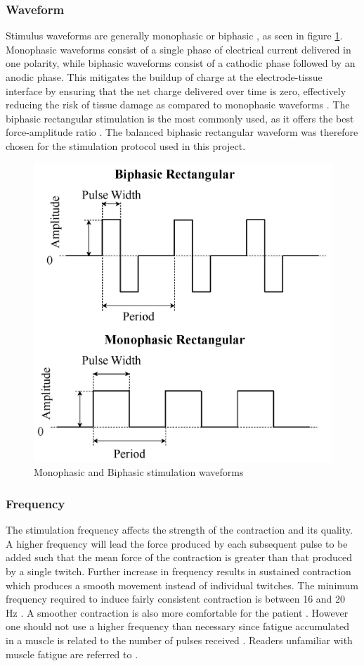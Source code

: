 \subsubsection{Waveform}
Stimulus waveforms are generally monophasic or biphasic \cite{lynch_functional_2008}, as seen in figure \ref{fig:twowave}. Monophasic waveforms consist of a single phase of electrical current delivered in one polarity, while biphasic waveforms consist of a cathodic phase followed by an anodic phase. This mitigates the buildup of charge at the electrode-tissue interface by ensuring that the net charge delivered over time is zero, effectively reducing the risk of tissue damage as compared to monophasic waveforms \cite{peckham_functional_2005}. The biphasic rectangular stimulation is the most commonly used, as it offers the best force-amplitude ratio \cite{lynch_functional_2008}. The balanced biphasic rectangular waveform was therefore chosen for the stimulation protocol used in this project.
 \begin{figure} [H]
     \centering
     \includegraphics[width=0.6\linewidth]{images/twowaveform.jpg}
     \caption{Monophasic and Biphasic stimulation waveforms \cite{vrontos_electrical_2024}}
     \label{fig:twowave}
 \end{figure}

 \subsubsection{Frequency}
 The stimulation frequency affects the strength of the contraction and its quality. A higher frequency will lead the force produced by each subsequent pulse to be added such that the mean force of the contraction is greater than that produced by a single twitch. Further increase in frequency results in sustained contraction which produces a smooth movement instead of individual twitches. The minimum frequency required to induce fairly consistent contraction is between 16 and 20 Hz \cite{marquez-chin_functional_2020}. A smoother contraction is also more comfortable for the patient \cite{wood_chapter_2020}. However one should not use a higher frequency than necessary since fatigue accumulated in a muscle is related to the number of pulses received \cite{bigland-ritchie_muscle_2000}. Readers unfamiliar with muscle fatigue are referred to \cite{thrasher_reducing_2005}.

